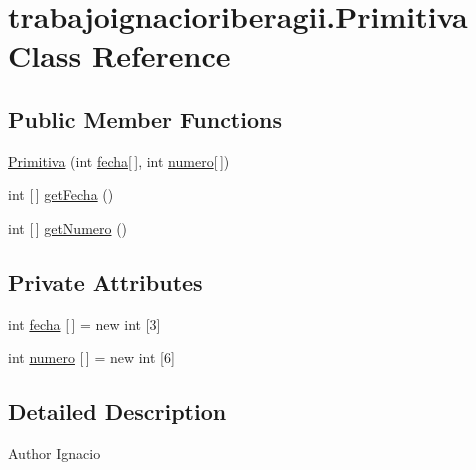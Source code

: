 \hypertarget{classtrabajoignacioriberagii_1_1_primitiva}{}\section{trabajoignacioriberagii.\+Primitiva Class Reference}
\label{classtrabajoignacioriberagii_1_1_primitiva}
\subsection*{Public Member Functions}
\begin{DoxyCompactItemize}
\item 
\mbox{\hyperlink{classtrabajoignacioriberagii_1_1_primitiva_a9320d03673870456e51eedf94aa1f2d2}{Primitiva}} (int \mbox{\hyperlink{classtrabajoignacioriberagii_1_1_primitiva_aed579bc382e7b2690693c47175ee5ba7}{fecha}}\mbox{[}$\,$\mbox{]}, int \mbox{\hyperlink{classtrabajoignacioriberagii_1_1_primitiva_a950834ca537595189c226c313d28341b}{numero}}\mbox{[}$\,$\mbox{]})
\item 
int \mbox{[}$\,$\mbox{]} \mbox{\hyperlink{classtrabajoignacioriberagii_1_1_primitiva_a7be163e2f1b97cbf54236653c7a95cd8}{get\+Fecha}} ()
\item 
int \mbox{[}$\,$\mbox{]} \mbox{\hyperlink{classtrabajoignacioriberagii_1_1_primitiva_aad3bcddbc88a37caff530abeb09322a6}{get\+Numero}} ()
\end{DoxyCompactItemize}
\subsection*{Private Attributes}
\begin{DoxyCompactItemize}
\item 
int \mbox{\hyperlink{classtrabajoignacioriberagii_1_1_primitiva_aed579bc382e7b2690693c47175ee5ba7}{fecha}} \mbox{[}$\,$\mbox{]} = new int \mbox{[}3\mbox{]}
\item 
int \mbox{\hyperlink{classtrabajoignacioriberagii_1_1_primitiva_a950834ca537595189c226c313d28341b}{numero}} \mbox{[}$\,$\mbox{]} = new int \mbox{[}6\mbox{]}
\end{DoxyCompactItemize}


\subsection{Detailed Description}
\begin{DoxyAuthor}{Author}
Ignacio 
\end{DoxyAuthor}


